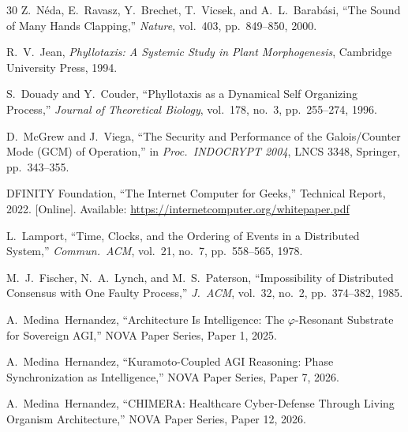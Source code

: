 \documentclass[12pt]{article}
\begin{document}
\begin{thebibliography}{30}
Z.~N\'eda, E.~Ravasz, Y.~Brechet, T.~Vicsek, and A.~L.~Barab\'asi, ``The Sound of Many Hands Clapping,'' \emph{Nature}, vol.~403, pp.~849--850, 2000.

R.~V.~Jean, \emph{Phyllotaxis: A Systemic Study in Plant Morphogenesis}, Cambridge University Press, 1994.

S.~Douady and Y.~Couder, ``Phyllotaxis as a Dynamical Self Organizing Process,'' \emph{Journal of Theoretical Biology}, vol.~178, no.~3, pp.~255--274, 1996.

D.~McGrew and J.~Viega, ``The Security and Performance of the Galois/Counter Mode (GCM) of Operation,'' in \emph{Proc.\ INDOCRYPT 2004}, LNCS 3348, Springer, pp.~343--355.

DFINITY Foundation, ``The Internet Computer for Geeks,'' Technical Report, 2022. [Online]. Available: \url{https://internetcomputer.org/whitepaper.pdf}

L.~Lamport, ``Time, Clocks, and the Ordering of Events in a Distributed System,'' \emph{Commun.\ ACM}, vol.~21, no.~7, pp.~558--565, 1978.

M.~J.~Fischer, N.~A.~Lynch, and M.~S.~Paterson, ``Impossibility of Distributed Consensus with One Faulty Process,'' \emph{J.\ ACM}, vol.~32, no.~2, pp.~374--382, 1985.

A.~Medina~Hernandez, ``Architecture Is Intelligence: The $\varphi$-Resonant Substrate for Sovereign AGI,'' NOVA Paper Series, Paper 1, 2025.

A.~Medina~Hernandez, ``Kuramoto-Coupled AGI Reasoning: Phase Synchronization as Intelligence,'' NOVA Paper Series, Paper 7, 2026.

A.~Medina~Hernandez, ``CHIMERA: Healthcare Cyber-Defense Through Living Organism Architecture,'' NOVA Paper Series, Paper 12, 2026.

\end{thebibliography}
\end{document}
